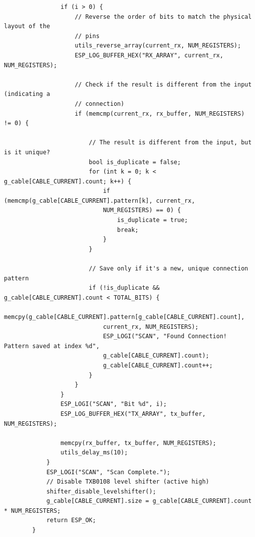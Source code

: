 \begin{listing}[H]
    \begin{verbatim}
                if (i > 0) {
                    // Reverse the order of bits to match the physical layout of the
                    // pins
                    utils_reverse_array(current_rx, NUM_REGISTERS);
                    ESP_LOG_BUFFER_HEX("RX_ARRAY", current_rx, NUM_REGISTERS);
                    
                    // Check if the result is different from the input (indicating a
                    // connection)
                    if (memcmp(current_rx, rx_buffer, NUM_REGISTERS) != 0) {
                        
                        // The result is different from the input, but is it unique?
                        bool is_duplicate = false;
                        for (int k = 0; k < g_cable[CABLE_CURRENT].count; k++) {
                            if (memcmp(g_cable[CABLE_CURRENT].pattern[k], current_rx,
                            NUM_REGISTERS) == 0) {
                                is_duplicate = true;
                                break;
                            }
                        }
                        
                        // Save only if it's a new, unique connection pattern
                        if (!is_duplicate && g_cable[CABLE_CURRENT].count < TOTAL_BITS) {
                            memcpy(g_cable[CABLE_CURRENT].pattern[g_cable[CABLE_CURRENT].count],
                            current_rx, NUM_REGISTERS);
                            ESP_LOGI("SCAN", "Found Connection! Pattern saved at index %d",
                            g_cable[CABLE_CURRENT].count);
                            g_cable[CABLE_CURRENT].count++;
                        }
                    }
                }
                ESP_LOGI("SCAN", "Bit %d", i);
                ESP_LOG_BUFFER_HEX("TX_ARRAY", tx_buffer, NUM_REGISTERS);
                
                memcpy(rx_buffer, tx_buffer, NUM_REGISTERS);
                utils_delay_ms(10);
            }
            ESP_LOGI("SCAN", "Scan Complete.");
            // Disable TXB0108 level shifter (active high)
            shifter_disable_levelshifter();
            g_cable[CABLE_CURRENT].size = g_cable[CABLE_CURRENT].count * NUM_REGISTERS;
            return ESP_OK;
        }
    \end{verbatim}
    \caption[scan\_cable pt 3]{Code van de functie die de kabels inleest deel 3.}
    \label{cf:scan_cable_3}
\end{listing}

